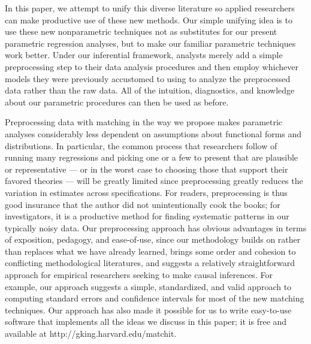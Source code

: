 \documentclass[11pt,titlepage]{article}
\begin{document}
In this paper, we attempt to unify this diverse literature so applied
researchers can make productive use of these new methods.  Our simple
unifying idea is to use these new nonparametric techniques not as
substitutes for our present parametric regression analyses, but to
make our familiar parametric techniques work better.  Under our
inferential framework, analysts merely add a simple preprocessing step
to their data analysis procedures and then employ whichever models
they were previously accustomed to using to analyze the preprocessed
data rather than the raw data.  All of the intuition, diagnostics, and
knowledge about our parametric procedures can then be used as before.

Preprocessing data with matching in the way we propose makes
parametric analyses considerably less dependent on assumptions about
functional forms and distributions.  In particular, the common process
that researchers follow of running many regressions and picking one or
a few to present that are plausible or representative --- or in the
worst case to choosing those that support their favored theories ---
will be greatly limited since preprocessing greatly reduces the
variation in estimates across specifications.  For readers,
preprocessing is thus good insurance that the author did not
unintentionally cook the books; for investigators, it is a productive
method for finding systematic patterns in our typically noisy data.
Our preprocessing approach has obvious advantages in terms of
exposition, pedagogy, and ease-of-use, since our methodology builds on
rather than replaces what we have already learned, brings some order
and cohesion to conflicting methodological literatures, and suggests a
relatively straightforward approach for empirical researchers seeking
to make causal inferences.  For example, our approach suggests a
simple, standardized, and valid approach to computing standard errors
and confidence intervals for most of the new matching techniques.  Our
approach has also made it possible for us to write easy-to-use
software that implements all the ideas we discuss in this paper; it is
free and available at http://gking.harvard.edu/matchit.
\end{document}
